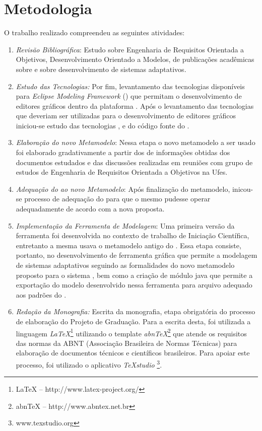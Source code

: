 \section{Metodologia}
\label{sec-intro-metodologia}

O trabalho realizado compreendeu as seguintes atividades:


\begin{enumerate}
	
	\item \textit{Revisão Bibliográfica}: Estudo sobre Engenharia de Requisitos Orientada a Objetivos, Desenvolvimento Orientado a Modelos, de publicações acadêmicas sobre \zanshin e sobre desenvolvimento de sistemas adaptativos. 
	
	\item \textit{Estudo das Tecnologias:} Por fim, levantamento das tecnologias disponíveis para \textit{Eclipse Modeling Framework} (\emf) que permitam o desenvolvimento de editores gráficos dentro da plataforma \eclipse. Após o levantamento das tecnologias que deveriam ser utilizadas para o desenvolvimento de editores gráficos iniciou-se estudo das tecnologias \emf, \sirius e do código fonte do \zanshin.
	
	\item \textit{Elaboração do novo Metamodelo}: Nessa etapa o novo metamodelo a ser usado foi elaborado gradativamente a partir dos de informações obtidas dos documentos estudados e das discussões realizadas em reuniões com grupo de estudos de Engenharia de Requisitos Orientada a Objetivos na Ufes.
	
	\item \textit{Adequação do \zanshin ao novo Metamodelo}: Após finalização do metamodelo, inicou-se processo de adequação do \framework para que o mesmo pudesse operar adequadamente de acordo com a nova proposta.
	
	\item \textit{Implementação da Ferramenta de Modelagem}: Uma primeira versão da ferramenta foi desenvolvida no contexto de trabalho de Iniciação Científica, entretanto a mesma usava o metamodelo antigo do \zanshin. Essa etapa consiste, portanto, no desenvolvimento de ferramenta gráfica que permite a modelagem de sistemas adaptativos seguindo as formalidades do novo metamodelo proposto para o sistema \zanshin, bem como a criação de módulo java que permite a exportação do modelo desenvolvido nessa ferramenta para arquivo \xml adequado aos padrões do \framework. 
	
	\item \textit{Redação da Monografia:} Escrita da monografia, etapa obrigatória do processo de elaboração do Projeto de Graduação. Para a escrita desta, foi utilizada a linguagem \textit{LaTeX}\footnote{LaTeX -- http://www.latex-project.org/} utilizando o template \textit{abnTeX}\footnote{abnTeX -- http://www.abntex.net.br} que atende os requisitos das normas da ABNT (Associação Brasileira de Normas Técnicas) para elaboração de documentos técnicos e científicos brasileiros. Para apoiar este processo, foi utilizado o aplicativo \textit{TeXstudio} \footnote{www.texstudio.org}.
	
\end{enumerate}


